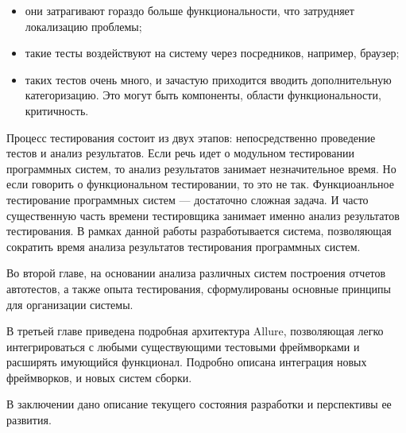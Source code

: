 \begin{itemize}
\item они затрагивают гораздо больше функциональности, что затрудняет локализацию проблемы; 
\item такие тесты воздействуют на систему через посредников, например, браузер;
\item таких тестов очень много, и зачастую приходится вводить дополнительную категоризацию. Это могут быть компоненты, области функциональности, критичность.
\end{itemize}

Процесс тестирования состоит из двух этапов: непосредственно проведение тестов и анализ результатов. Если речь идет о модульном тестировании программных систем, то анализ результатов занимает незначительное время. Но если говорить о функциональном тестировании, то это не так. Функциоанльное тестирование программных систем --- достаточно сложная задача. И часто существенную часть времени тестировщика занимает именно анализ результатов тестирования. В рамках данной работы разработывается система, позволяющая сократить время анализа результатов тестирования программных систем.

Во второй главе, на основании анализа различных систем построения отчетов автотестов, а также опыта тестирования, сформулированы основные принципы для организации системы.

В третьей главе приведена подробная архитектура Allure, позволяющая легко интегрироваться с любыми существующими тестовыми фреймворками и расширять имующийся функционал. Подробно описана интеграция новых фреймворков, и новых систем сборки.

В заключении дано описание текущего состояния разработки и перспективы ее развития.